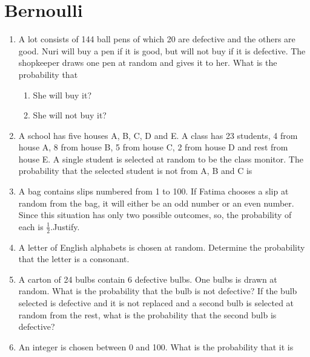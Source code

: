 \section{Bernoulli}
\begin{enumerate}[label=\thesection.\arabic*,ref=\thesection.\theenumi]
	\item A lot consists of 144 ball pens of which 20 are defective and the 
    others are good. Nuri will buy a pen if it is good, but will not buy if it 
    is defective. The shopkeeper draws one pen at random and gives it to her. 
    What is the probability that
    \begin{enumerate}
        \item She will buy it?
        \item She will not buy it?
    \end{enumerate}
\solution

\item A school has five houses A, B, C, D and E. A class has 23 students, 4 from house
A, 8 from house B, 5 from house C, 2 from house D and rest from house E. A
single student is selected at random to be the class monitor. The probability that the
selected student is not from A, B and C is \\
\solution

\item A bag contains slips numbered from 1 to 100. If Fatima chooses a slip at random
from the bag, it will either be an odd number or an even number. Since this situation
has only two possible outcomes, so, the probability of each is $\frac{1}{2}$.Justify.\\
\solution

\item A letter of English alphabets is chosen at random. Determine the probability that the letter is a consonant.\\
    \solution
    
\item A carton of 24 bulbs contain 6 defective bulbs. One bulbs is drawn at random.
What is the probability that the bulb is not defective? If the bulb selected is defective
and it is not replaced and a second bulb is selected at random from the rest, what
is the probability that the second bulb is defective?\\
\solution

\item An integer is chosen between 0 and 100. What is the probability that it is 
	\begin{enumerate}

\end{enumerate}
\end{enumerate}
